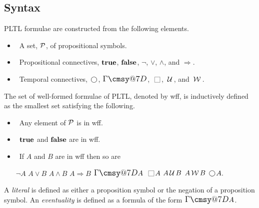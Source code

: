 \documentclass[nohyperref]{acmtrans2f}
\makeatletter
\def\sometime{\mathord{\hbox{\large$\mathchar"0\cmsy@7D$}}}
\newcommand{\always}{\raisebox{-.2ex}{
                           \mbox{\unitlength=0.9ex
                           \begin{picture}(2,2)
                           \linethickness{0.06ex}
                           \put(0,0){\line(1,0){2}}
                           \put(0,2){\line(1,0){2}}
                           \put(0,0){\line(0,1){2}}
                           \put(2,0){\line(0,1){2}}
                           \end{picture}}}
                          \,}
\newcommand{\next}{\!\raisebox{-.2ex}{ %
                        \mbox{\unitlength=0.9ex
                        \begin{picture}(2,2)
                        \linethickness{0.06ex}
                        \put(1,1){\circle{2}} %
                        \end{picture}}}       %
                        \,}
\def\until{\hbox{$\,\cal U \,$}}
\def\unless{\hbox{$\,\cal W \,$}}
\let\iff=\Leftrightarrow
\def\ltrue{\hbox{\rm\bf true}}
\def\lfalse{\hbox{\rm\bf false}}
\def\lstart{\hbox{\rm\bf start}}
\makeatother
\begin{document}
\subsection{Syntax}
\label{sec.ptl.syntax}
%
PLTL formulae are constructed from the following elements.
%
\begin{itemize} 
\item ~A set, ${\cal P}$, of propositional symbols.
\item ~Propositional connectives, $\ltrue$, $\lfalse$, $\neg$, $\lor$,
      $\land$, and  $\Rightarrow$.
\item ~Temporal connectives, $\next$, $\sometime$, $\always$, $\until$,
      and $\unless$. 
\end{itemize}
%
The set of well-formed formulae of PLTL, denoted by {\sc wff}, is
inductively defined as the smallest set satisfying the following.
%
\begin{itemize}
\item ~Any element of ${\cal P}$ is in {\sc wff}.
\item ~$\ltrue$ and $\lfalse$ are in {\sc wff}.
\item ~If $A$ and $B$ are in {\sc wff} then so are
      \begin{center}
         $\neg A$ \quad $A \lor B$ \quad $A \land B$ \quad $A
         \Rightarrow B$ 
\quad $\sometime A$ \quad
         $\always A$ \quad $A \until B$ \quad $A \unless B$ \quad
         $\next A.$   
      \end{center}
\end{itemize}
%
A {\it literal} is defined as either a proposition symbol or the negation of
a proposition symbol.
%
An {\it eventuality} is defined as a formula of the form $\sometime A$.

\end{document}
